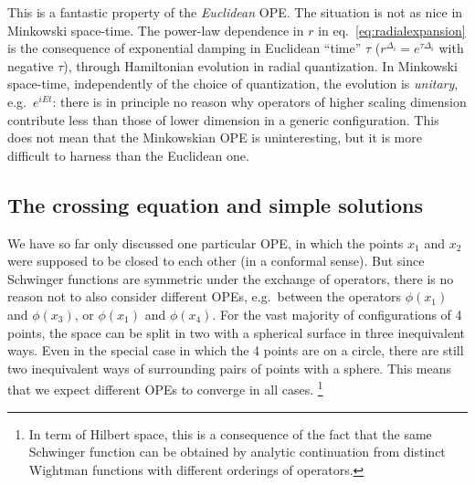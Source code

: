 \documentclass[a4paper,12pt]{article}
\numberwithin{equation}{section}
\begin{document}
This is a fantastic property of the \emph{Euclidean} OPE. The situation is not as nice in Minkowski space-time. 
The power-law dependence in $r$ in eq.~\eqref{eq:radialexpansion} is the consequence of exponential damping in Euclidean ``time'' $\tau$ ($r^{\Delta_i} = e^{\tau \Delta_i}$ with negative $\tau$), through Hamiltonian evolution in radial quantization.
In Minkowski space-time, independently of the choice of quantization, the evolution is \emph{unitary}, e.g.~$e^{i E t}$: there is in principle no reason why operators of higher scaling dimension contribute less than those of lower dimension in a generic configuration.
This does not mean that the Minkowskian OPE is uninteresting, but it is more difficult to harness than the Euclidean one.


\subsection{The crossing equation and simple solutions}

We have so far only discussed one particular OPE, in which the points $x_1$ and $x_2$ were supposed to be closed to each other (in a conformal sense). But since Schwinger functions are symmetric under the exchange of operators, there is no reason not to also consider different OPEs, e.g.~between the operators $\phi(x_1)$ and $\phi(x_3)$, or $\phi(x_1)$ and $\phi(x_4)$.
For the vast majority of configurations of 4 points, the space can be split in two with a spherical surface in three inequivalent ways. Even in the special case in which the 4 points are on a circle, there are still two inequivalent ways of surrounding pairs of points with a sphere. This means that we expect different OPEs to converge in all cases.%
%
\footnote{In term of Hilbert space, this is a consequence of the fact that the same Schwinger function can be obtained by analytic continuation from distinct Wightman functions with different orderings of operators.}
\end{document}
